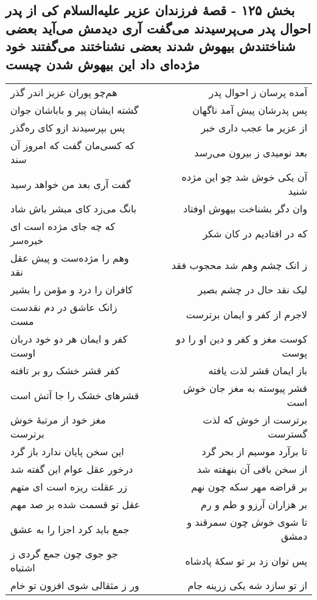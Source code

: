 \begin{center}
\section*{بخش ۱۲۵ - قصهٔ فرزندان عزیر علیه‌السلام کی از پدر احوال پدر می‌پرسیدند می‌گفت آری دیدمش می‌آید بعضی شناختندش بیهوش شدند بعضی نشناختند می‌گفتند خود مژده‌ای داد این بیهوش شدن  چیست}
\label{sec:sh125}
\begin{longtable}{l p{0.5cm} r}
هم‌چو پوران عزیز اندر گذر
&&
آمده پرسان ز احوال پدر
\\
گشته ایشان پیر و باباشان جوان
&&
پس پدرشان پیش آمد ناگهان
\\
پس بپرسیدند ازو کای ره‌گذر
&&
از عزیر ما عجب داری خبر
\\
که کسی‌مان گفت که امروز آن سند
&&
بعد نومیدی ز بیرون می‌رسد
\\
گفت آری بعد من خواهد رسید
&&
آن یکی خوش شد چو این مژده شنید
\\
بانگ می‌زد کای مبشر باش شاد
&&
وان دگر بشناخت بیهوش اوفتاد
\\
که چه جای مژده است ای خیره‌سر
&&
که در افتادیم در کان شکر
\\
وهم را مژده‌ست و پیش عقل نقد
&&
ز انک چشم وهم شد محجوب فقد
\\
کافران را درد و مؤمن را بشیر
&&
لیک نقد حال در چشم بصیر
\\
زانک عاشق در دم نقدست مست
&&
لاجرم از کفر و ایمان برترست
\\
کفر و ایمان هر دو خود دربان اوست
&&
کوست مغز و کفر و دین او را دو پوست
\\
کفر قشر خشک رو بر تافته
&&
باز ایمان قشر لذت یافته
\\
قشرهای خشک را جا آتش است
&&
قشر پیوسته به مغز جان خوش است
\\
مغز خود از مرتبهٔ خوش برترست
&&
برترست از خوش که لذت گسترست
\\
این سخن پایان ندارد باز گرد
&&
تا برآرد موسیم از بحر گرد
\\
درخور عقل عوام این گفته شد
&&
از سخن باقی آن بنهفته شد
\\
زر عقلت ریزه است ای متهم
&&
بر قراضه مهر سکه چون نهم
\\
عقل تو قسمت شده بر صد مهم
&&
بر هزاران آرزو و طم و رم
\\
جمع باید کرد اجزا را به عشق
&&
تا شوی خوش چون سمرقند و دمشق
\\
جو جوی چون جمع گردی ز اشتباه
&&
پس توان زد بر تو سکهٔ پادشاه
\\
ور ز مثقالی شوی افزون تو خام
&&
از تو سازد شه یکی زرینه جام

\end{longtable}
\end{center}
